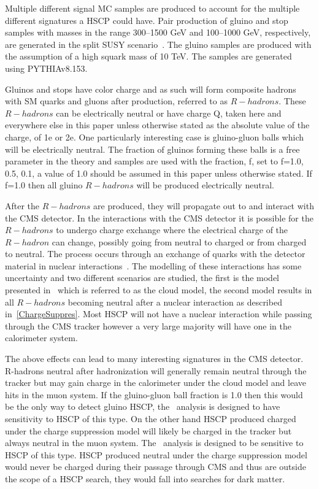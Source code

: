 Multiple different signal MC samples are produced to account for the multiple different signatures a HSCP could have. Pair production of gluino and stop samples with
masses in the range 300--1500 GeV and 100--1000 GeV, respectively, are generated in the split SUSY scenario~\cite{SplitSUSY1, SplitSUSY2}. The gluino samples are produced
with the assumption of a high squark mass of 10 TeV. The samples are generated using PYTHIAv8.153. 

Gluinos and stops have color charge and as such will form composite hadrons with SM quarks and gluons after production, referred to as $R-hadrons$.
These $R-hadrons$ can be electrically neutral or have charge Q, taken here and everywhere else in this paper unless otherwise stated as the absolute value of the charge,
of 1e or 2e. One particularly interesting case is gluino-gluon balls which will be electrically neutral. The fraction of gluinos forming these balls is
a free parameter in the theory and samples are used with the fraction, f, set to f=1.0, 0.5, 0.1, a value of 1.0 should be assumed in this paper unless
otherwise stated. If f=1.0 then all gluino $R-hadrons$ will be produced electrically neutral.

After the $R-hadrons$ are produced, they will propagate out to and interact with the CMS detector. In the interactions with the CMS
detector it is possible for the $R-hadrons$ to undergo charge exchange where the electrical charge of the $R-hadron$ can change, possibly going from neutral
to charged or from charged to neutral. The process occurs through an exchange of quarks with the detector material in nuclear interactions~\cite{SMP}. The modelling of these
interactions has some uncertainty and two different scenarios are studied, the first is the model presented in~\cite{Cloud, Cloud2} which is referred to
as the cloud model, the second model results in all $R-hadrons$ becoming neutral after a nuclear interaction as described in~\ref{ChargeSuppres}.
Most HSCP will not have a nuclear interaction while passing through the CMS tracker however a very large majority will have one in the calorimeter system.

The above effects can lead to many interesting signatures in the CMS detector. R-hadrons neutral after hadronization will generally remain neutral through the tracker
but may gain charge in the calorimeter under the cloud model and leave hits in the muon system. If the gluino-gluon ball fraction is 1.0 then this would
be the only way to detect gluino HSCP, the \muononly\ analysis is designed to have sensitivity to HSCP of this type. On the other hand HSCP produced charged under
the charge suppression model will likely be charged in the tracker but always neutral in the muon system. The \tkonly\ analysis is designed to be sensitive
to HSCP of this type. HSCP produced neutral under the charge suppression model would never be charged during their passage through CMS and thus are outside the scope
of a HSCP search, they would fall into searches for dark matter.

